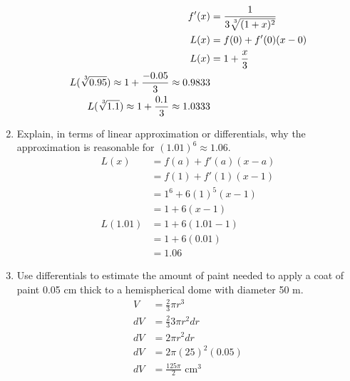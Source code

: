 \documentclass{article}
\begin{document}
\begin{enumerate}
	$$\begin{align}
		f'(x)&=\frac{1}{3\sqrt[\leftroot{-2}\uproot{2}3]{(1+x)^2}}\\
		L(x)&=f(0)+f'(0)(x-0)\\
		L(x)&=1+\frac{x}{3}\\
		L(\sqrt[\leftroot{-2}\uproot{2}3]{0.95})\approx 1+\frac{-0.05}{3}\approx 0.9833\\
		L(\sqrt[\leftroot{-2}\uproot{2}3]{1.1})\approx 1+\frac{0.1}{3}\approx 1.0333
	\end{align}$$
	\begin{center}
		\pgfplotsset{width=13cm,height=8cm, axis equal}
	\end{center}
\setcounter{enumi}{19}
	\item Explain, in terms of linear approximation or differentials, why the approximation is reasonable for $(1.01)^6\approx 1.06$.
	$$\begin{align}
		L(x)&=f(a)+f'(a)(x-a)\\
		&=f(1)+f'(1)(x-1)\\
		&=1^6+6(1)^5(x-1)\\
		&=1+6(x-1)\\
		L(1.01)&=1+6(1.01-1)\\
		&=1+6(0.01)\\
		&=\boxed{1.06}
	\end{align}$$
\setcounter{enumi}{29}
	\item Use differentials to estimate the amount of paint needed to apply a coat of paint 0.05 cm thick to a hemispherical dome with diameter 50 m.
	$$\begin{align}
		V&=\frac{2}{3}\pi r^3\\
		dV&=\frac{2}{3}3\pi r^2dr\\
		dV&=2\pi r^2 dr\\
		dV&=2\pi(25)^2(0.05)\\
		dV&=\boxed{\frac{125\pi}{2}\text{ cm}^3}
	\end{align}$$
\end{enumerate}

%
\end{document}
